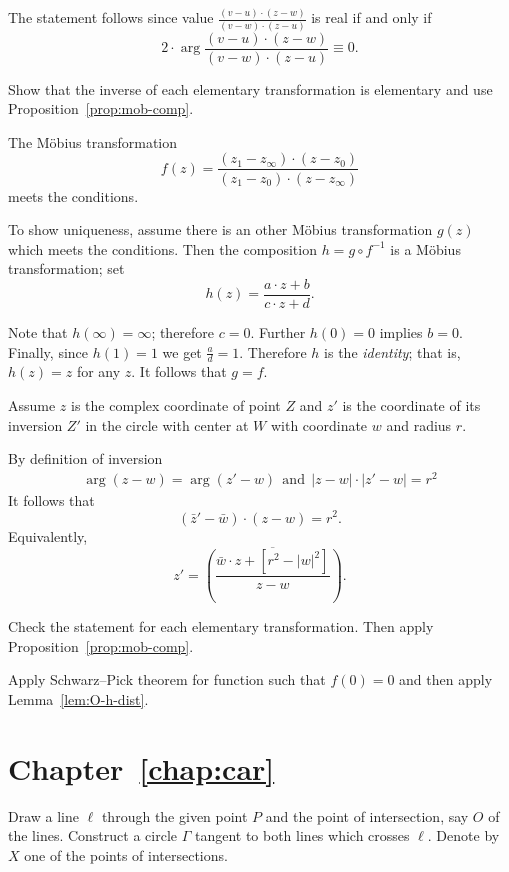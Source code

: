 The statement follows since value $\tfrac{(v-u)\cdot(z-w)}{(v-w)\cdot(z-u)}$ is real if and only if 
\[2\cdot\arg\frac{(v-u)\cdot(z-w)}{(v-w)\cdot(z-u)}\equiv0.\]


Show that the inverse of each elementary transformation is elementary
and use Proposition~\ref{prop:mob-comp}.

The M\"obius transformation
\[f(z)=\frac{(z_1-z_\infty)\cdot(z-z_0)}{(z_1-z_0)\cdot(z-z_\infty)}\]
meets the conditions.

To show uniqueness, assume there is an other M\"obius transformation
$g(z)$ which meets the conditions.
Then the composition
$h=g\circ f^{-1}$ 
is a M\"obius transformation; set
$$h(z)=\frac{a\cdot z+b}{c\cdot z+d}.$$ 

Note that $h(\infty)=\infty$;
therefore $c=0$.
Further $h(0)=0$ implies $b=0$.
Finally, since $h(1)=1$ we get $\tfrac ad=1$.
Therefore $h$ is the \emph{identity};
that is, $h(z)=z$ for any $z$.
It follows that $g=f$.

Assume $z$ is the complex coordinate of point $Z$
and $z'$ is the coordinate of its inversion $Z'$
in the circle with center at $W$ with coordinate $w$ and radius $r$.

By definition of inversion  
\begin{align*}
\arg (z-w)=\arg (z'-w)
\ \ 
\text{and}
\ \ 
|z-w|\cdot|z'-w|=r^2
\end{align*}
It follows that
\[(\bar z'-\bar w)\cdot ( z- w)= r^2.\]
Equivalently,
\[z'=\overline{\left(\frac{\bar w\cdot  z+[r^2-|w|^2]}{z-  w}\right)}.\]

 
Check the statement for each elementary transformation.
Then apply Proposition~\ref{prop:mob-comp}.

Apply Schwarz--Pick theorem for function such that $f(0)=0$ and then apply Lemma~\ref{lem:O-h-dist}.

\section*{Chapter~\ref{chap:car}}
\setcounter{eqtn}{0}


Draw a line $\ell$ through the given point $P$ and the point of intersection, say $O$ of the lines.
Construct a circle $\Gamma$ tangent to both lines which crosses $\ell$. 
Denote by $X$ one of the points of intersections.

